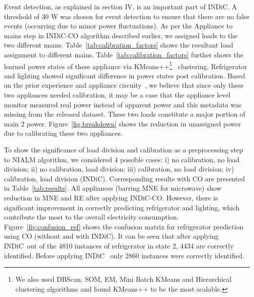 \documentclass[conference]{IEEEtran}
\newcommand{\figref}[1]{Figure~\ref{#1}}
\newcommand{\tabref}[1]{Table~\ref{#1}}
\newcommand{\indic}{INDiC~}
\newcommand{\indicns}{INDiC}
\begin{document}
\noindent Event detection, as explained in section IV, is an important part of \indicns. A threshold of 30 W was chosen for event detection to ensure that there are no false events (occurring due to minor power fluctuations). As per the Appliance to mains step in \indicns-CO algorithm described earlier, we assigned loads to the two different mains. \tabref{tab:calibration_factors} shows the resultant load assignment to different mains. \tabref{tab:calibration_factors} further shows the learned power states of these appliance via KMeans++\footnote{We also used DBScan, SOM, EM, Mini Batch KMeans and Hierarchical clustering algorithms and found KMeans++ to be the most scalable.}~\cite{kmeansplusplus} clustering. Refrigerator and lighting showed significant difference in power states post calibration. Based on the prior experience and appliance circuity~\cite{ting2005}, we believe that since only these two appliances needed calibration, it may be a case that the appliance level monitor measured real power instead of apparent power and this metadata was missing from the released dataset. These two loads constitute a major portion of main 2 power. \figref{fig:breakdown} shows the reduction in unassigned power due to calibrating these two appliances. 

\noindent To show the significance of load division and calibration as a preprocessing step to NIALM algorithm, we considered 4 possible cases:  i) no calibration, no load division; ii) no calibration, load division; iii) calibration, no load division; iv) calibration, load division (\indicns). Corresponding results with CO are presented in \tabref{tab:results}.
  All appliances (barring MNE for microwave) show reduction in MNE and RE after applying \indicns-CO. However, there is significant improvement in correctly predicting refrigerator and lighting, which contribute the most to the overall electricity consumption. \figref{fig:confusion_ref} shows the confusion matrix for refrigerator prediction using CO (without and with \indicns). It can be seen that after applying \indic out of the 4810 instances of refrigerator in state 2, 4434 are correctly identified. Before applying \indic
only 2860 instances were correctly identified.
%
\end{document}
